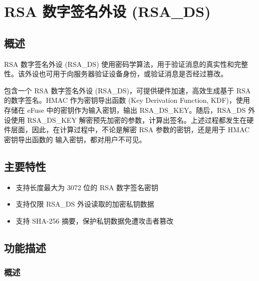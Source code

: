 \documentclass[main\_\_CN.tex]{subfiles}
\begin{document}

\ifglobal
\else
    {\let\clearpage\relax \listoftodos}
    {\let\clearpage\relax \listofdonetodos}
    \tableofcontents
\fi



\chapter{RSA 数字签名外设 (RSA\_DS)}
\label{mod:digsig}
\hypertarget{digsig}{}\hypertarget{rsads}{}


\section{概述}

RSA 数字签名外设 (RSA\_DS) 使用密码学算法，用于验证消息的真实性和完整性。该外设也可用于向服务器验证设备身份，或验证消息是否经过篡改。

\chipname{} 包含一个 RSA 数字签名外设 (RSA\_DS)，可提供硬件加速，高效生成基于 RSA 的数字签名。HMAC 作为密钥导出函数 (Key Derivation Function, KDF)，使用存储在 eFuse 中的密钥作为输入密钥，输出 RSA\_DS\_KEY。随后，RSA\_DS 外设使用 RSA\_DS\_KEY 解密预先加密的参数，计算出签名。上述过程都发生在硬件层面，因此，在计算过程中，不论是解密 RSA 参数的密钥，还是用于 HMAC 密钥导出函数的
 输入密钥，都对用户不可见。

\section{主要特性}

\begin{itemize}
\item 支持长度最大为 3072 位的 RSA 数字签名密钥
\item 支持仅限 RSA\_DS 外设读取的加密私钥数据
\item 支持 SHA-256 摘要，保护私钥数据免遭攻击者篡改
\end{itemize}


\section{功能描述}
\subsection{概述}
\end{document}
